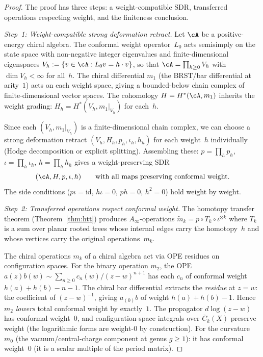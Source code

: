 \begin{proof}
The proof has three steps: a weight-compatible SDR, transferred
operations respecting weight, and the finiteness conclusion.

\emph{Step~1: Weight-compatible strong deformation retract.}
Let $\cA$ be a positive-energy chiral algebra.  The conformal
weight operator~$L_0$ acts semisimply on the state space with
non-negative integer eigenvalues and finite-dimensional eigenspaces
$V_h := \{v \in \cA : L_0 v = h \cdot v\}$, so that
$\cA = \prod_{h \ge 0} V_h$ with $\dim V_h < \infty$ for
all~$h$.  The chiral differential $m_1$ (the BRST/bar differential
at arity~$1$) acts on each weight space, giving a bounded-below
chain complex of finite-dimensional vector spaces.  The
cohomology $H = H^*(\cA, m_1)$ inherits the weight grading:
$H_h = H^*(V_h, m_1|_{V_h})$ for each~$h$.

Since each $(V_h, m_1|_{V_h})$ is a finite-dimensional chain
complex, we can choose a strong deformation retract
$(V_h, H_h, p_h, \iota_h, h_h)$ for each weight~$h$
individually (Hodge decomposition or explicit splitting).
Assembling these: $p = \prod_h p_h$,
$\iota = \prod_h \iota_h$,
$h = \prod_h h_h$ gives a weight-preserving SDR
\[
(\cA, H, p, \iota, h)
\qquad\text{with all maps preserving conformal weight.}
\]
The side conditions ($p\iota = \mathrm{id}$, $h\iota = 0$,
$ph = 0$, $h^2 = 0$) hold weight by weight.

\emph{Step~2: Transferred operations respect conformal weight.}
The homotopy transfer theorem
(Theorem~\ref{thm:htt}) produces $A_\infty$-operations
$\tilde{m}_k = p \circ T_k \circ \iota^{\otimes k}$
where $T_k$ is a sum over planar rooted trees whose internal
edges carry the homotopy~$h$ and whose vertices carry the
original operations~$m_k$.

The chiral operations $m_k$ of a chiral algebra act via
OPE residues on configuration spaces.  For the binary
operation $m_2$, the OPE
$a(z)b(w) \sim \sum_{n \ge 0} c_n(w)/(z-w)^{n+1}$ has
each $c_n$ of conformal weight $h(a) + h(b) - n - 1$.
The chiral bar differential extracts the \emph{residue}
at $z = w$: the coefficient of $(z-w)^{-1}$, giving
$a_{(0)}b$ of weight $h(a) + h(b) - 1$.  Hence
$m_2$ \emph{lowers} total conformal weight by exactly~$1$.
The propagator $d\log(z - w)$ has conformal weight~$0$,
and configuration-space integrals over
$\overline{C}_k(X)$ preserve weight (the logarithmic
forms are weight-$0$ by construction).
For the curvature~$m_0$ (the vacuum/central-charge
component at genus $g \ge 1$): it has conformal weight~$0$
(it is a scalar multiple of the period matrix).


\end{proof}
